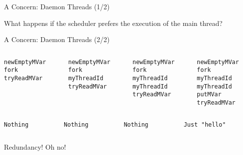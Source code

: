 \documentclass{beamer}
\begin{document}
\begin{frame}[fragile]{A Concern: Daemon Threads \hfill \footnotesize (1/2)}
\begin{center}
\end{center}

What happens if the scheduler prefers the execution of the main
thread?
\end{frame}

\begin{frame}{A Concern: Daemon Threads \hfill \footnotesize (2/2)}
\begin{columns}[t]
\begin{column}{0.25\textwidth}
\texttt{newEmptyMVar}\\
\texttt{fork}\\
\texttt{tryReadMVar}
\end{column}
\begin{column}{0.25\textwidth}
\texttt{newEmptyMVar}\\
\texttt{fork}\\
\texttt{myThreadId}\\
\texttt{tryReadMVar}
\end{column}
\begin{column}{0.25\textwidth}
\texttt{newEmptyMVar}\\
\texttt{fork}\\
\texttt{myThreadId}\\
\texttt{myThreadId}\\
\texttt{tryReadMVar}
\end{column}
\begin{column}{0.25\textwidth}
\texttt{newEmptyMVar}\\
\texttt{fork}\\
\texttt{myThreadId}\\
\texttt{myThreadId}\\
\texttt{putMVar}\\
\texttt{tryReadMVar}
\end{column}
\end{columns}

\noindent\makebox[\linewidth]{\rule{\paperwidth}{0.4pt}}

\begin{columns}[t]
\begin{column}{0.25\textwidth}
\texttt{Nothing}
\end{column}
\begin{column}{0.25\textwidth}
\texttt{Nothing}
\end{column}
\begin{column}{0.25\textwidth}
\texttt{Nothing}
\end{column}
\begin{column}{0.25\textwidth}
\texttt{Just "hello"}
\end{column}
\end{columns}

\vspace{0.5cm}
Redundancy!  Oh no!
\end{frame}
\end{document}
